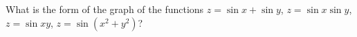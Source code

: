 What is the form of the graph of the functions $z = \sin x + \sin y$,
$z = \sin x\sin y$, $z = \sin xy$, $z = \sin(x^{2} + y^{2})$?

